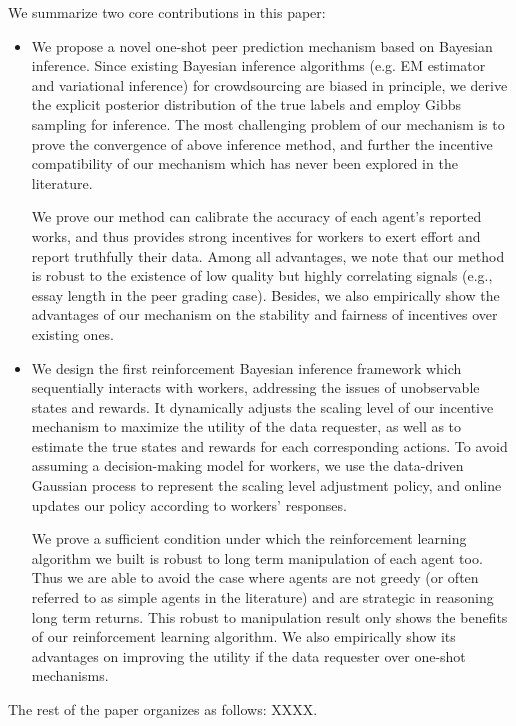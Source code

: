 We summarize two core contributions in this paper:
\begin{itemize}
\item We propose a novel one-shot peer prediction mechanism based on Bayesian inference. Since existing Bayesian inference algorithms (e.g. EM estimator and variational inference) for crowdsourcing are biased in principle, we derive the explicit posterior distribution of the true labels and employ Gibbs sampling for inference. The most challenging problem of our mechanism is to prove the convergence of above inference method, and further the incentive compatibility of our mechanism which has never been explored in the literature. 

We prove our method can calibrate the accuracy of each agent's reported works, and thus provides strong incentives for workers to exert effort and report truthfully their data. Among all advantages, we note that our method is robust to the existence of low quality but highly correlating signals (e.g., essay length in the peer grading case). Besides, we also empirically show the advantages of our mechanism on the stability and fairness of incentives over existing ones.
\item We design the first reinforcement Bayesian inference framework which sequentially interacts with workers, addressing the issues of unobservable states and rewards. It dynamically adjusts the scaling level of our incentive mechanism to maximize the utility of the data requester, as well as to estimate the true states and rewards for each corresponding actions. To avoid assuming a decision-making model for workers, we use the data-driven Gaussian process to represent the scaling level adjustment policy, and online updates our policy according to workers' responses. 

We prove a sufficient condition under which the reinforcement learning algorithm we built is robust to long term manipulation of each agent too. Thus we are able to avoid the case where agents are not greedy (or often referred to as simple agents in the literature) and are strategic in reasoning long term returns. This robust to manipulation result only shows the benefits of our reinforcement learning algorithm. We also empirically show its advantages on improving the utility if the data requester over one-shot mechanisms.
\end{itemize}

The rest of the paper organizes as follows: XXXX.